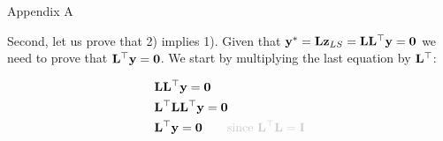 \documentclass{beamer}
\begin{document}
\begin{frame}{Appendix A}
	\begin{flushleft}
		
		
		Second, let us prove that 2) implies 1). Given that $\mathbf{y}^* = \mathbf{L}\mathbf{z}_{LS} = \mathbf{L}\mathbf{L}^\top \mathbf{y} = \mathbf{0}$ we need to prove that $\mathbf{L}^\top \mathbf{y} = \mathbf{0}$. We start by multiplying the last equation by $\mathbf{L}^\top$:
		
		\begin{align}
			& \bo{L}\bo{L}\T \bo{y} = \bo{0} \\
			& \bo{L}\T \bo{L}\bo{L}\T \bo{y} = \bo{0} \\
			& \bo{L}\T \bo{y} = \bo{0}  \ \ \ \ \ \ \textcolor{mygray}{\text{since }  \bo{L}\T \bo{L} = \bo{I}}
		\end{align}		
		
	\end{flushleft}
\end{frame}
\end{document}
